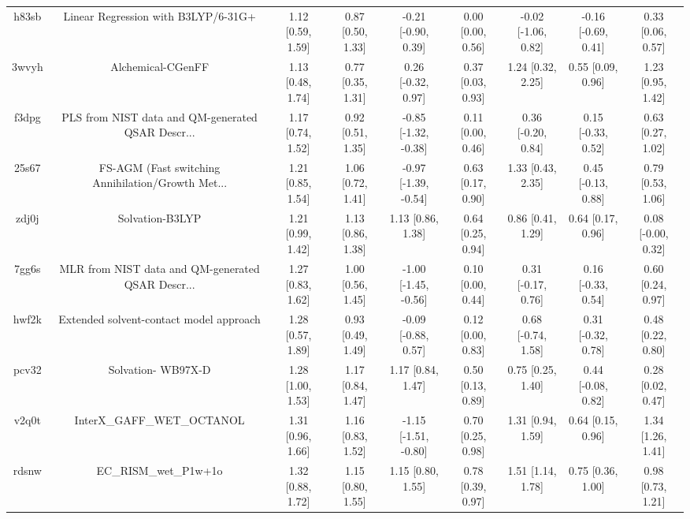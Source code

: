 \documentclass{article}
\begin{document}
\begin{center}
\begin{longtable}{|ccccccccc|}
 h83sb &                Linear Regression with B3LYP/6-31G+ &  1.12 [0.59, 1.59] &  0.87 [0.50, 1.33] &   -0.21 [-0.90, 0.39] &  0.00 [0.00, 0.56] &  -0.02 [-1.06, 0.82] &  -0.16 [-0.69, 0.41] &     0.33 [0.06, 0.57] \\
 3wvyh &                                  Alchemical-CGenFF &  1.13 [0.48, 1.74] &  0.77 [0.35, 1.31] &    0.26 [-0.32, 0.97] &  0.37 [0.03, 0.93] &    1.24 [0.32, 2.25] &    0.55 [0.09, 0.96] &     1.23 [0.95, 1.42] \\
 f3dpg &  PLS from NIST data and QM-generated QSAR Descr... &  1.17 [0.74, 1.52] &  0.92 [0.51, 1.35] &  -0.85 [-1.32, -0.38] &  0.11 [0.00, 0.46] &   0.36 [-0.20, 0.84] &   0.15 [-0.33, 0.52] &     0.63 [0.27, 1.02] \\
 25s67 &  FS-AGM (Fast switching Annihilation/Growth Met... &  1.21 [0.85, 1.54] &  1.06 [0.72, 1.41] &  -0.97 [-1.39, -0.54] &  0.63 [0.17, 0.90] &    1.33 [0.43, 2.35] &   0.45 [-0.13, 0.88] &     0.79 [0.53, 1.06] \\
 zdj0j &                                    Solvation-B3LYP &  1.21 [0.99, 1.42] &  1.13 [0.86, 1.38] &     1.13 [0.86, 1.38] &  0.64 [0.25, 0.94] &    0.86 [0.41, 1.29] &    0.64 [0.17, 0.96] &    0.08 [-0.00, 0.32] \\
 7gg6s &  MLR from NIST data and QM-generated QSAR Descr... &  1.27 [0.83, 1.62] &  1.00 [0.56, 1.45] &  -1.00 [-1.45, -0.56] &  0.10 [0.00, 0.44] &   0.31 [-0.17, 0.76] &   0.16 [-0.33, 0.54] &     0.60 [0.24, 0.97] \\
 hwf2k &            Extended solvent-contact model approach &  1.28 [0.57, 1.89] &  0.93 [0.49, 1.49] &   -0.09 [-0.88, 0.57] &  0.12 [0.00, 0.83] &   0.68 [-0.74, 1.58] &   0.31 [-0.32, 0.78] &     0.48 [0.22, 0.80] \\
 pcv32 &                                 Solvation- WB97X-D &  1.28 [1.00, 1.53] &  1.17 [0.84, 1.47] &     1.17 [0.84, 1.47] &  0.50 [0.13, 0.89] &    0.75 [0.25, 1.40] &   0.44 [-0.08, 0.82] &     0.28 [0.02, 0.47] \\
 v2q0t &                         InterX\_GAFF\_WET\_OCTANOL &  1.31 [0.96, 1.66] &  1.16 [0.83, 1.52] &  -1.15 [-1.51, -0.80] &  0.70 [0.25, 0.98] &    1.31 [0.94, 1.59] &    0.64 [0.15, 0.96] &     1.34 [1.26, 1.41] \\
 rdsnw &                              EC\_RISM\_wet\_P1w+1o &  1.32 [0.88, 1.72] &  1.15 [0.80, 1.55] &     1.15 [0.80, 1.55] &  0.78 [0.39, 0.97] &    1.51 [1.14, 1.78] &    0.75 [0.36, 1.00] &     0.98 [0.73, 1.21] \\

\end{longtable}
\end{center}
\end{document}

